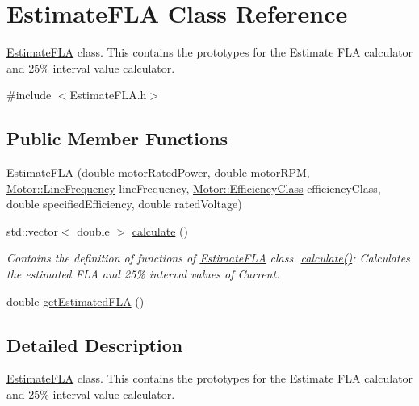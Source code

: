 \hypertarget{class_estimate_f_l_a}{}\section{Estimate\+F\+LA Class Reference}
\label{class_estimate_f_l_a}


\hyperlink{class_estimate_f_l_a}{Estimate\+F\+LA} class. This contains the prototypes for the Estimate F\+LA calculator and 25\% interval value calculator.  




{\ttfamily \#include $<$Estimate\+F\+L\+A.\+h$>$}

\subsection*{Public Member Functions}
\begin{DoxyCompactItemize}
\item 
\hyperlink{class_estimate_f_l_a_ace098c4a684eb4926b20322cf65da32d}{Estimate\+F\+LA} (double motor\+Rated\+Power, double motor\+R\+PM, \hyperlink{class_motor_acee1bdf1b684ad36cb80dc2829d9fcee}{Motor\+::\+Line\+Frequency} line\+Frequency, \hyperlink{class_motor_afa022971ae062406a9f588c601673d4e}{Motor\+::\+Efficiency\+Class} efficiency\+Class, double specified\+Efficiency, double rated\+Voltage)
\item 
std\+::vector$<$ double $>$ \hyperlink{class_estimate_f_l_a_ae8601d58dbeab855ade2e3f06ccf6cec}{calculate} ()
\begin{DoxyCompactList}\small\item\em Contains the definition of functions of \hyperlink{class_estimate_f_l_a}{Estimate\+F\+LA} class. \hyperlink{class_estimate_f_l_a_ae8601d58dbeab855ade2e3f06ccf6cec}{calculate()}\+: Calculates the estimated F\+LA and 25\% interval values of Current. \end{DoxyCompactList}\item 
double \hyperlink{class_estimate_f_l_a_a84bebf788da566929b85d3deb8fd9755}{get\+Estimated\+F\+LA} ()
\end{DoxyCompactItemize}


\subsection{Detailed Description}
\hyperlink{class_estimate_f_l_a}{Estimate\+F\+LA} class. This contains the prototypes for the Estimate F\+LA calculator and 25\% interval value calculator. 


